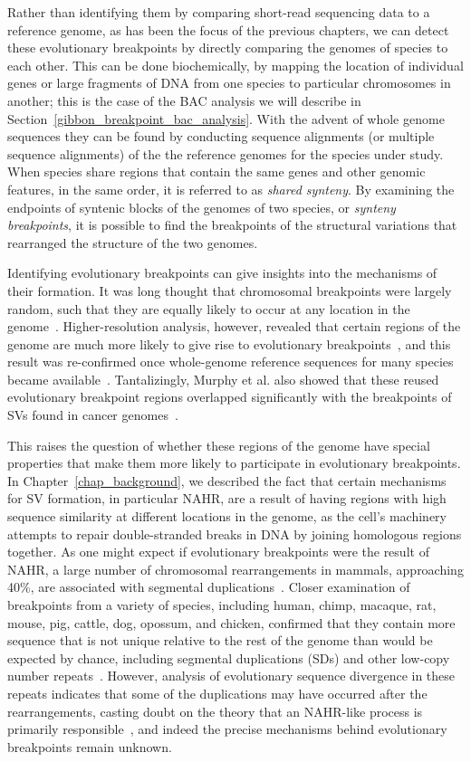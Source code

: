 Rather than identifying them by comparing short-read sequencing data to a reference genome, as has been the focus of the previous chapters, we can detect these evolutionary breakpoints by directly comparing the genomes of species to each other. This can be done biochemically, by mapping the location of individual genes or large fragments of DNA from one species to particular chromosomes in another; this is the case of the BAC analysis we will describe in Section~\ref{gibbon_breakpoint_bac_analysis}. With the advent of whole genome sequences they can be found by conducting sequence alignments (or multiple sequence alignments) of the the reference genomes for the species under study. When species share regions that contain the same genes and other genomic features, in the same order, it is referred to as \emph{shared synteny}. By examining the endpoints of syntenic blocks of the genomes of two species, or \emph{synteny breakpoints}, it is possible to find the breakpoints of the structural variations that rearranged the structure of the two genomes.

Identifying evolutionary breakpoints can give insights into the mechanisms of their formation. It was long thought that chromosomal breakpoints were largely random, such that they are equally likely to occur at any location in the genome~\cite{Ono:1973tr,Nadeau:1984tm}. Higher-resolution analysis, however, revealed that certain regions of the genome are much more likely to give rise to evolutionary breakpoints~\cite{Pevzner:2003ba}, and this result was re-confirmed once whole-genome reference sequences for many species became available~\cite{Murphy:2005hv}. Tantalizingly, Murphy et al. also showed that these reused evolutionary breakpoint regions overlapped significantly with the breakpoints of SVs found in cancer genomes~\cite{Murphy:2005hv}.

This raises the question of whether these regions of the genome have special properties that make them more likely to participate in evolutionary breakpoints. In Chapter~\ref{chap_background}, we described the fact that certain mechanisms for SV formation, in particular NAHR, are a result of having regions with high sequence similarity at different locations in the genome, as the cell's machinery attempts to repair double-stranded breaks in DNA by joining homologous regions together. As one might expect if evolutionary breakpoints were the result of NAHR, a large number of chromosomal rearrangements in mammals, approaching 40\%, are associated with segmental duplications~\cite{Bailey:2004fb,Bailey:2006fn}. Closer examination of breakpoints from a variety of species, including human, chimp, macaque, rat, mouse, pig, cattle, dog, opossum, and chicken, confirmed that they contain more sequence that is not unique relative to the rest of the genome than would be expected by chance, including segmental duplications (SDs) and other low-copy number repeats~\cite{Larkin:2009ij}. However, analysis of evolutionary sequence divergence in these repeats indicates that some of the duplications may have occurred after the rearrangements, casting doubt on the theory that an NAHR-like process is primarily responsible~\cite{Bailey:2004fb}, and indeed the precise mechanisms behind evolutionary breakpoints remain unknown.

